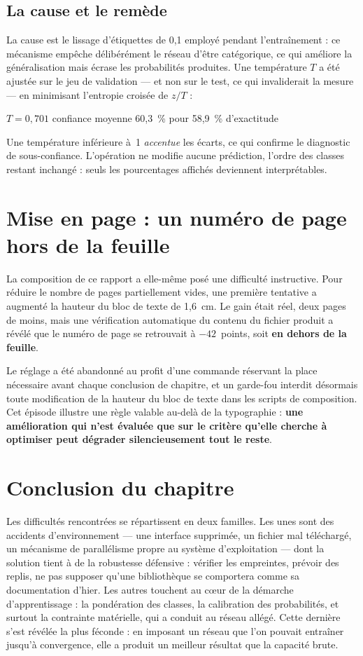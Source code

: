 \documentclass[a4paper,12pt]{report}
\begin{document}
\subsection*{La cause et le remède}
La cause est le lissage d'étiquettes de 0{,}1 employé pendant l'entraînement :
ce mécanisme empêche délibérément le réseau d'être catégorique, ce qui améliore
la généralisation mais écrase les probabilités produites. Une température $T$
a été ajustée sur le jeu de validation --- et non sur le test, ce qui
invaliderait la mesure --- en minimisant l'entropie croisée de $z/T$ :

\begin{center}
$T = 0{,}701$ \quad\textrightarrow\quad confiance moyenne 60{,}3~\%
pour 58{,}9~\% d'exactitude
\end{center}

Une température inférieure à~1 \emph{accentue} les écarts, ce qui confirme le
diagnostic de sous-confiance. L'opération ne modifie aucune prédiction, l'ordre
des classes restant inchangé : seuls les pourcentages affichés deviennent
interprétables.

\section{Mise en page : un numéro de page hors de la feuille}

La composition de ce rapport a elle-même posé une difficulté instructive. Pour
réduire le nombre de pages partiellement vides, une première tentative a
augmenté la hauteur du bloc de texte de 1{,}6~cm. Le gain était réel, deux
pages de moins, mais une vérification automatique du contenu du fichier produit
a révélé que le numéro de page se retrouvait à $-42$~points, soit
\textbf{en dehors de la feuille}.

Le réglage a été abandonné au profit d'une commande réservant la place
nécessaire avant chaque conclusion de chapitre, et un garde-fou interdit
désormais toute modification de la hauteur du bloc de texte dans les scripts de
composition. Cet épisode illustre une règle valable au-delà de la typographie :
\textbf{une amélioration qui n'est évaluée que sur le critère qu'elle cherche à
optimiser peut dégrader silencieusement tout le reste}.

\section*{Conclusion du chapitre}
Les difficultés rencontrées se répartissent en deux familles. Les unes sont
des accidents d'environnement --- une interface supprimée, un fichier mal
téléchargé, un mécanisme de parallélisme propre au système d'exploitation ---
dont la solution tient à de la robustesse défensive : vérifier les empreintes,
prévoir des replis, ne pas supposer qu'une bibliothèque se comportera comme sa
documentation d'hier. Les autres touchent au cœur de la démarche
d'apprentissage : la pondération des classes, la calibration des probabilités,
et surtout la contrainte matérielle, qui a conduit au réseau allégé. Cette
dernière s'est révélée la plus féconde : en imposant un réseau que l'on pouvait
entraîner jusqu'à convergence, elle a produit un meilleur résultat que la
capacité brute.
\end{document}
